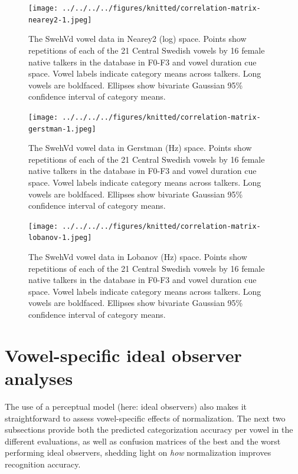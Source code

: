 \documentclass[utf8]{frontiers_suppmat} %
\begin{document}
\begin{figure}[H]
\texttt{[image: ../../../../figures/knitted/correlation-matrix-nearey2-1.jpeg]} \caption{The SwehVd vowel data in Nearey2 (log) space. Points show repetitions of each of the 21 Central Swedish vowels by 16 female native talkers in the database in F0-F3 and vowel duration cue space. Vowel labels indicate category means across talkers. Long vowels are boldfaced. Ellipses show bivariate Gaussian 95\% confidence interval of category means.}\label{fig:correlation-matrix-nearey2}
\end{figure}



\begin{figure}[H]
\texttt{[image: ../../../../figures/knitted/correlation-matrix-gerstman-1.jpeg]} \caption{The SwehVd vowel data in Gerstman (Hz) space. Points show repetitions of each of the 21 Central Swedish vowels by 16 female native talkers in the database in F0-F3 and vowel duration cue space. Vowel labels indicate category means across talkers. Long vowels are boldfaced. Ellipses show bivariate Gaussian 95\% confidence interval of category means.}\label{fig:correlation-matrix-gerstman}
\end{figure}



\begin{figure}[H]
\texttt{[image: ../../../../figures/knitted/correlation-matrix-lobanov-1.jpeg]} \caption{The SwehVd vowel data in Lobanov (Hz) space. Points show repetitions of each of the 21 Central Swedish vowels by 16 female native talkers in the database in F0-F3 and vowel duration cue space. Vowel labels indicate category means across talkers. Long vowels are boldfaced. Ellipses show bivariate Gaussian 95\% confidence interval of category means.}\label{fig:correlation-matrix-lobanov}
\end{figure}

\newpage

\hypertarget{sec:vowel-specific}{%
\section{Vowel-specific ideal observer analyses}\label{sec:vowel-specific}}

The use of a perceptual model (here: ideal observers) also makes it straightforward to assess vowel-specific effects of normalization. The next two subsections provide both the predicted categorization accuracy per vowel in the different evaluations, as well as confusion matrices of the best and the worst performing ideal observers, shedding light on \emph{how} normalization improves recognition accuracy.
\end{document}
